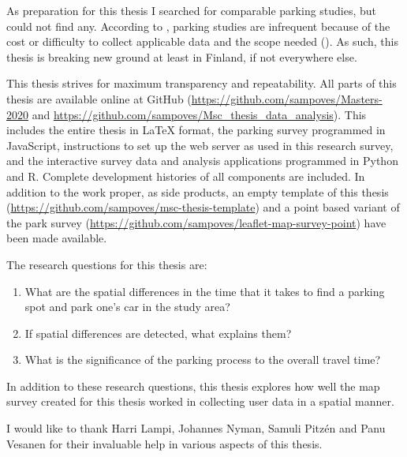 As preparation for this thesis I searched for comparable parking studies, but could not find any. According to \citeauthor{Diallo2015}, parking studies are infrequent because of the cost or difficulty to collect applicable data and the scope needed (\citeyear{Diallo2015}). As such, this thesis is breaking new ground at least in Finland, if not everywhere else.

This thesis strives for maximum transparency and repeatability. All parts of this thesis are available online at GitHub (\textcolor{blue}{\url{https://github.com/sampoves/Masters-2020}} and \textcolor{blue}{\url{https://github.com/sampoves/Msc_thesis_data_analysis}}). This includes the entire thesis in LaTeX format, the parking survey programmed in JavaScript, instructions to set up the web server as used in this research survey, and the interactive survey data and analysis applications programmed in Python and R. Complete development histories of all components are included. In addition to the work proper, as side products, an empty template of this thesis (\textcolor{blue}{\url{https://github.com/sampoves/msc-thesis-template}}) and a point based variant of the park survey (\textcolor{blue}{\url{https://github.com/sampoves/leaflet-map-survey-point}}) have been made available.

\bigskip
\noindent
The research questions for this thesis are:

\begin{spacing}{1}
    \begin{enumerate}[label=\Roman*]
      \item What are the spatial differences in the time that it takes to find a parking spot and park one’s car in the study area?
      \item If spatial differences are detected, what explains them?
      \item What is the significance of the parking process to the overall travel time?
    \end{enumerate}
\end{spacing}
\bigskip
In addition to these research questions, this thesis explores how well the map survey created for this thesis worked in collecting user data in a spatial manner.

I would like to thank Harri Lampi, Johannes Nyman, Samuli Pitzén and Panu Vesanen for their invaluable help in various aspects of this thesis.